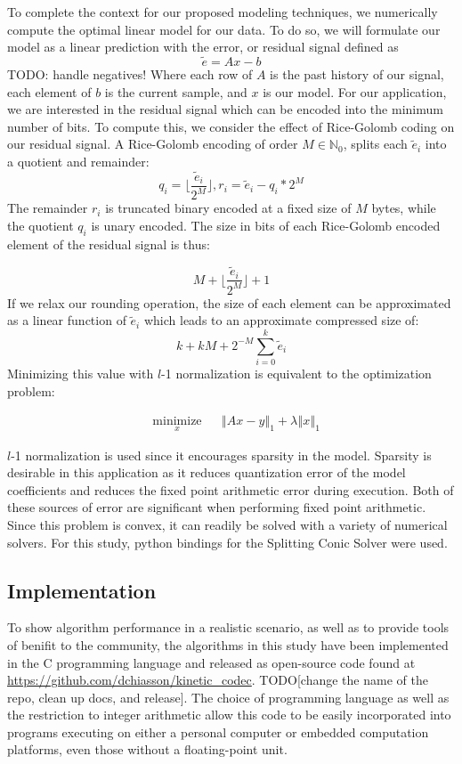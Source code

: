 \documentclass[journal]{IEEEtran}
\begin{document}
To complete the context for our proposed modeling techniques, we numerically compute the optimal linear model for our data. To do so, we will formulate our model as a linear prediction with the error, or residual signal defined as
$$\tilde{e} = Ax-b$$
TODO: handle negatives!
Where each row of $A$ is the past history of our signal, each element of $b$ is the current sample, and $x$ is our model. For our application, we are interested in the residual signal which can be encoded into the minimum number of bits. To compute this, we consider the effect of Rice-Golomb coding on our residual signal. A Rice-Golomb encoding of order $M \in \mathbb{N}_0$, splits each $\tilde{e}_i$ into a quotient and remainder:
$$ q_i = \lfloor \frac{\tilde{e}_i}{2^M} \rfloor, r_i = \tilde{e}_i - q_i * 2^M  $$
The remainder $r_i$ is truncated binary encoded at a fixed size of $M$ bytes, while the quotient $q_i$ is unary encoded. The size in bits of each Rice-Golomb encoded element of the residual signal is thus:

$$ M + \lfloor\frac{\tilde{e}_i}{2^M}\rfloor + 1$$
If we relax our rounding operation, the size of each element can be approximated as a linear function of $\tilde{e}_i$ which leads to an approximate compressed size of:
 $$k+kM+ 2^{-M}\sum_{i=0}^k \tilde{e}_i$$
 Minimizing this value with $l$-1 normalization is equivalent to the optimization problem:
 
\begin{equation*}
\begin{aligned}
& \underset{x}{\text{minimize}}
& & \left\Vert Ax-y \right\Vert_1 + \lambda\left\Vert x \right\Vert_1
\end{aligned}
\end{equation*}

$l$-1 normalization is used since it encourages sparsity in the model. Sparsity is desirable in this application as it reduces quantization error of the model coefficients and reduces the fixed point arithmetic error during execution. Both of these sources of error are significant when performing fixed point arithmetic. Since this problem is convex, it can readily be solved with a variety of numerical solvers. For this study, python bindings for the Splitting Conic Solver were used\cite{ocpb:16}\cite{scs}\cite{cvxpy}.

\subsection{Implementation}

To show algorithm performance in a realistic scenario, as well as to provide tools of benifit to the community, the algorithms in this study have been implemented in the C programming language and released as open-source code found at \url{https://github.com/dchiasson/kinetic_codec}. TODO[change the name of the repo, clean up docs, and release]. The choice of programming language as well as the restriction to integer arithmetic allow this code to be easily incorporated into programs executing on either a personal computer or embedded computation platforms, even those without a floating-point unit.
\end{document}
